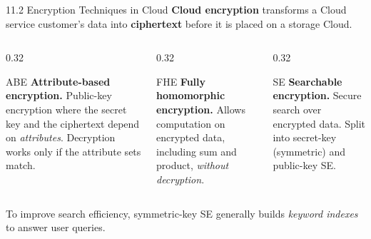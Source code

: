 \documentclass[11pt,aspectratio=169]{beamer}
\newcommand{\kw}[1]{\textbf{\color{accent}#1}}
\begin{document}
\begin{frame}{11.2 Encryption Techniques in Cloud}
  \small
  \kw{Cloud encryption} transforms a Cloud service customer's data into
  \kw{ciphertext} before it is placed on a storage Cloud.
  \vspace{0.9em}

  \begin{columns}[T,onlytextwidth]
    \begin{column}{0.32\textwidth}
      \begin{block}{ABE}
        \scriptsize
        \textbf{Attribute-based encryption.} Public-key encryption where the
        secret key and the ciphertext depend on \emph{attributes}. Decryption
        works only if the attribute sets match.
      \end{block}
    \end{column}
    \begin{column}{0.32\textwidth}
      \begin{block}{FHE}
        \scriptsize
        \textbf{Fully homomorphic encryption.} Allows computation on encrypted
        data, including sum and product, \emph{without decryption}.
      \end{block}
    \end{column}
    \begin{column}{0.32\textwidth}
      \begin{block}{SE}
        \scriptsize
        \textbf{Searchable encryption.} Secure search over encrypted data.
        Split into secret-key (symmetric) and public-key SE.
      \end{block}
    \end{column}
  \end{columns}
  \vspace{0.9em}
  {\footnotesize\color{accentmid}
  To improve search efficiency, symmetric-key SE generally builds
  \emph{keyword indexes} to answer user queries.}
\end{frame}
\end{document}
